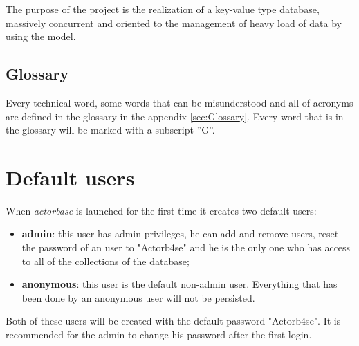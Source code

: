 \documentclass{scalatekids-article}
\begin{document}
The purpose of the project is the realization of a key-value type
 database,
massively concurrent and oriented to the management of heavy load of data by
using the  model.

\subsection{Glossary}
Every technical word, some words that can be misunderstood and all of acronyms are defined in the glossary in the appendix \ref{sec:Glossary}.
Every word that is in the glossary will be marked with a subscript ”G”.






\section{Default users}

When \textit{actorbase} is launched for the first time it creates two default users:
\begin{itemize}
\item \textbf{admin}: this user has admin privileges, he can add and remove users, reset the password of an user to "Actorb4se" and he is the only one who has access to all of the collections of the database;
\item \textbf{anonymous}: this user is the default non-admin user. Everything that has been done by an anonymous user will not be persisted.
\end{itemize}
Both of these users will be created with the default password "Actorb4se". It is recommended for the admin to change his password after the first login.
\end{document}
